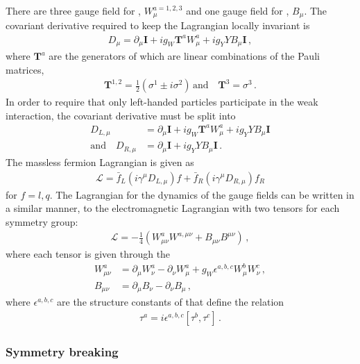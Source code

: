 There are three gauge field for \grpsutw, $W_\mu^{a=1,2,3}$ and one gauge field for  \grpuone, $B_\mu$.
The covariant derivative required to keep the Lagrangian locally invariant is
\begin{align}
D_\mu = \partial_\mu \mathbf{I} + i g_W \mathbf{T}^a W^{a}_\mu + i g_Y Y B_\mu \mathbf{I} \, ,
\end{align}
 where  $\mathbf{T}^a$ are the generators of \grpsutw which are linear combinations of the Pauli matrices,
\begin{align}
\mathbf{T}^{1,2} = \frac{1}{2}\left( \sigma^1 \pm i \sigma^2 \right) \, \text{and} \quad \mathbf{T}^3 = \sigma^3 \, .
\end{align}
In order to require that only left-handed particles participate in the weak interaction, the covariant derivative must be split into
\begin{align}
D_{L,\mu} &= \partial_\mu \mathbf{I} + i g_W \mathbf{T}^a W^{a}_\mu + i g_Y Y B_\mu \mathbf{I} \\
\mathrm{and} \quad  D_{R,\mu} &= \partial_\mu \mathbf{I} + i g_Y Y B_\mu \mathbf{I} \, .
\end{align}
The massless fermion Lagrangian is given as 
\begin{align}
\mathcal{L} = \bar{f}_{L} \left(i \gamma^\mu D_{L,\mu} \right) f + \bar{f}_{R} \left(i \gamma^\mu D_{R,\mu} \right) f_R
\end{align}
for $f = l,q$.
The Lagrangian for the dynamics of the gauge fields can be written in a 
similar manner, to the electromagnetic Lagrangian with two tensors for each symmetry group:
\begin{align}
\mathcal{L} = -\frac{1}{4} \left(  W^a_{\mu\nu} W^{a,\mu\nu} + B_{\mu\nu} B^{\mu\nu}   \right) \, ,
\end{align}
where each tensor is given through the 
\begin{align}
W^a_{\mu\nu} &= \partial_\mu W^a_{\nu}  - \partial_\nu W^a_{\mu}  + g_W \epsilon^{a,b,c} W^b_{\mu}  W^c_{\nu}  \, , \\
B_{\mu\nu} &= \partial_\mu B_\nu - \partial_\nu B_\mu \, ,
\end{align}
where $\epsilon^{a,b,c}$ are the structure constants of \grpsutw that define the relation 
\begin{align}
\tau^a = i \epsilon^{a,b,c} \left[ \tau^b, \tau^c  \right] \, .
\end{align}

\subsubsection{Symmetry breaking}


